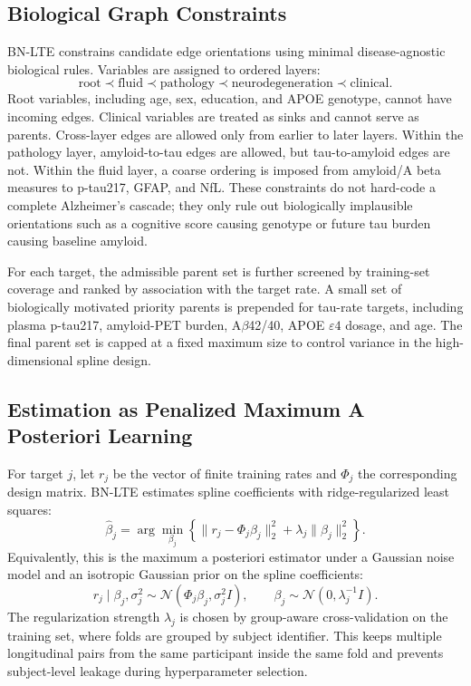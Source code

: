 \subsection{Biological Graph Constraints}

BN-LTE constrains candidate edge orientations using minimal disease-agnostic
biological rules. Variables are assigned to ordered layers:
\begin{equation}
\mathrm{root}
\prec
\mathrm{fluid}
\prec
\mathrm{pathology}
\prec
\mathrm{neurodegeneration}
\prec
\mathrm{clinical}.
\end{equation}
Root variables, including age, sex, education, and APOE genotype, cannot have
incoming edges. Clinical variables are treated as sinks and cannot serve as
parents. Cross-layer edges are allowed only from earlier to later layers. Within
the pathology layer, amyloid-to-tau edges are allowed, but tau-to-amyloid edges
are not. Within the fluid layer, a coarse ordering is imposed from amyloid/A
beta measures to p-tau217, GFAP, and NfL. These constraints do not hard-code a
complete Alzheimer's cascade; they only rule out biologically implausible
orientations such as a cognitive score causing genotype or future tau burden
causing baseline amyloid.

For each target, the admissible parent set is further screened by training-set
coverage and ranked by association with the target rate. A small set of
biologically motivated priority parents is prepended for tau-rate targets,
including plasma p-tau217, amyloid-PET burden, A$\beta$42/40, APOE
$\varepsilon 4$ dosage, and age. The final parent set is capped at a fixed
maximum size to control variance in the high-dimensional spline design.

\subsection{Estimation as Penalized Maximum A Posteriori Learning}

For target $j$, let $r_j$ be the vector of finite training rates and $\Phi_j$
the corresponding design matrix. BN-LTE estimates spline coefficients with
ridge-regularized least squares:
\begin{equation}
\widehat{\beta}_j
=
\arg\min_{\beta_j}
\left\{
\|r_j-\Phi_j\beta_j\|_2^2
+\lambda_j\|\beta_j\|_2^2
\right\}.
\label{eq:bnlte_ridge}
\end{equation}
Equivalently, this is the maximum a posteriori estimator under a Gaussian noise
model and an isotropic Gaussian prior on the spline coefficients:
\begin{equation}
r_j \mid \beta_j,\sigma_j^2
\sim
\mathcal{N}(\Phi_j\beta_j,\sigma_j^2 I),
\qquad
\beta_j \sim \mathcal{N}(0,\lambda_j^{-1}I).
\end{equation}
The regularization strength $\lambda_j$ is chosen by group-aware
cross-validation on the training set, where folds are grouped by subject
identifier. This keeps multiple longitudinal pairs from the same participant
inside the same fold and prevents subject-level leakage during hyperparameter
selection.

